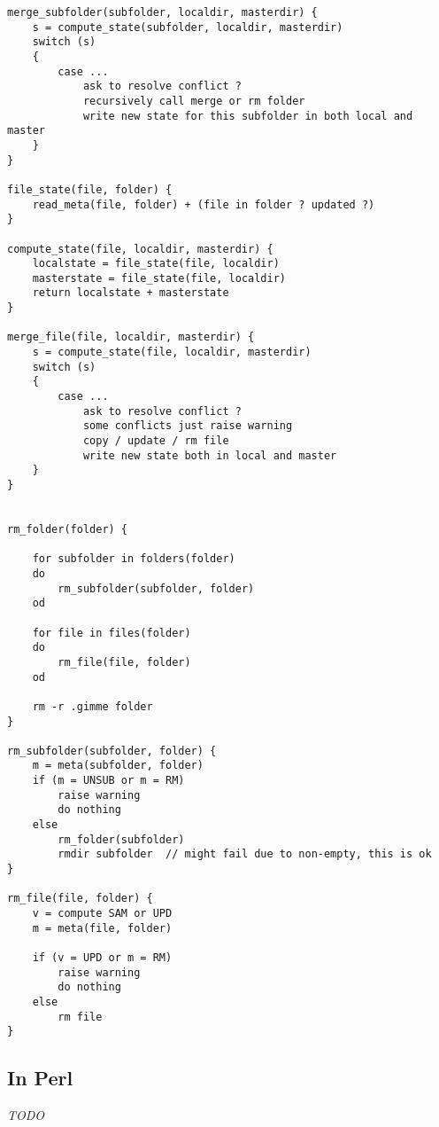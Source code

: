 \documentclass[10pt,a4paper]{article}
\begin{document}
\begin{lstlisting}[frame=ltbr, tabsize=4]
merge_subfolder(subfolder, localdir, masterdir) {
	s = compute_state(subfolder, localdir, masterdir)
	switch (s)
	{
		case ...
			ask to resolve conflict ?
			recursively call merge or rm folder
			write new state for this subfolder in both local and master
	}
}

file_state(file, folder) {
	read_meta(file, folder) + (file in folder ? updated ?)
}

compute_state(file, localdir, masterdir) {
	localstate = file_state(file, localdir)
	masterstate = file_state(file, localdir)
	return localstate + masterstate
}

merge_file(file, localdir, masterdir) {
	s = compute_state(file, localdir, masterdir)
	switch (s)
	{
		case ...
			ask to resolve conflict ?
			some conflicts just raise warning
			copy / update / rm file
			write new state both in local and master
	}
}


rm_folder(folder) {

	for subfolder in folders(folder)
	do
		rm_subfolder(subfolder, folder)
	od
	
	for file in files(folder)
	do
		rm_file(file, folder)
	od
	
	rm -r .gimme folder
}

rm_subfolder(subfolder, folder) {
	m = meta(subfolder, folder)
	if (m = UNSUB or m = RM)
		raise warning
		do nothing
	else
		rm_folder(subfolder)
		rmdir subfolder  // might fail due to non-empty, this is ok
}

rm_file(file, folder) {
	v = compute SAM or UPD
	m = meta(file, folder)

	if (v = UPD or m = RM)
		raise warning
		do nothing
	else
		rm file
}
\end{lstlisting}

\subsection{In Perl}

\textit{TODO}
\end{document}
